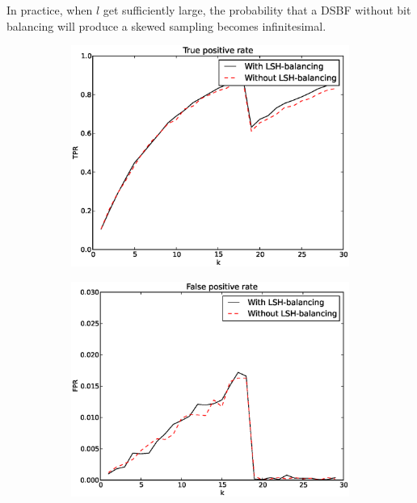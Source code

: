 \documentclass[a4paper,11pt]{article}
\begin{document}
In practice, when $l$ get sufficiently large, the probability that a DSBF without bit balancing will produce a skewed sampling becomes infinitesimal.
\begin{figure}[H]
\centering
\begin{subfigure}{.5\textwidth}
  \centering
  \includegraphics[width=.95\linewidth]{bitbalancing_TPR1}
\end{subfigure}%
\begin{subfigure}{.5\textwidth}
  \centering
  \includegraphics[width=.95\linewidth]{bitbalancing_FPR1}
\end{subfigure}
\begin{subfigure}{.5\textwidth}
  \centering

\end{subfigure}
\end{figure}
\end{document}
